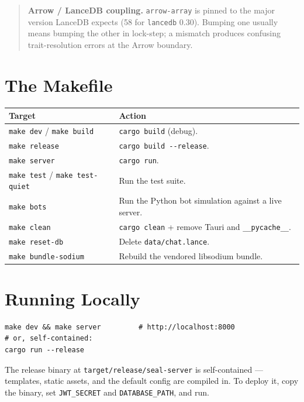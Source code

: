\begin{quote}
\textbf{Arrow / LanceDB coupling.} \verb|arrow-array| is pinned to the major
version LanceDB expects (58 for \verb|lancedb| 0.30). Bumping one usually means
bumping the other in lock-step; a mismatch produces confusing trait-resolution
errors at the Arrow boundary.
\end{quote}

\section{The Makefile}

\begin{center}
\begin{tabular}{@{}ll@{}}
\toprule
\textbf{Target} & \textbf{Action} \\
\midrule
\verb|make dev| / \verb|make build| & \verb|cargo build| (debug). \\
\verb|make release| & \verb|cargo build --release|. \\
\verb|make server| & \verb|cargo run|. \\
\verb|make test| / \verb|make test-quiet| & Run the test suite. \\
\verb|make bots| & Run the Python bot simulation against a live server. \\
\verb|make clean| & \verb|cargo clean| + remove Tauri and \verb|__pycache__|. \\
\verb|make reset-db| & Delete \verb|data/chat.lance|. \\
\verb|make bundle-sodium| & Rebuild the vendored libsodium bundle. \\
\bottomrule
\end{tabular}
\end{center}

\section{Running Locally}

\begin{lstlisting}
make dev && make server         # http://localhost:8000
# or, self-contained:
cargo run --release
\end{lstlisting}

The release binary at \verb|target/release/seal-server| is self-contained ---
templates, static assets, and the default config are compiled in. To deploy it,
copy the binary, set \verb|JWT_SECRET| and \verb|DATABASE_PATH|, and run.

